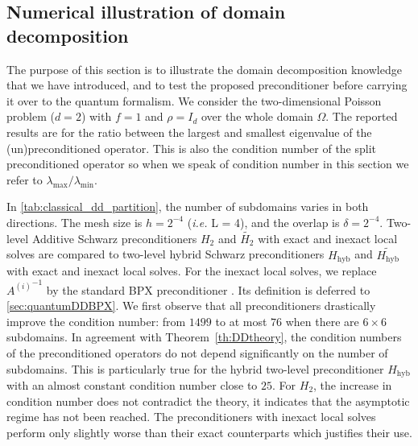 \documentclass[onefignum,onetabnum]{siamart251216}
\newcommand{\Hhyb}{H_{\text{hyb}}}
\newcommand{\Htwo}{H_2}
\newcommand{\Hhybap}{\widetilde{\Hhyb}}
\newcommand{\Htwoap}{\widetilde{\Htwo}}
\begin{document}
\subsection{Numerical illustration of domain decomposition}
The purpose of this section is to illustrate the domain decomposition knowledge that we have introduced, and to test the proposed preconditioner before carrying it over to the quantum formalism. We consider the two-dimensional Poisson problem ($d=2$) with $f=1$ and $\rho=I_d$ over the whole domain $\Omega$. The reported results are for the ratio between the largest and smallest eigenvalue of the (un)preconditioned operator. This is also the condition number of the split preconditioned operator so when we speak of condition number in this section we refer to ${\lambda_{\max}}/{\lambda_{\min}}$. 

In \cref{tab:classical_dd_partition}, the number of subdomains varies in both directions. The mesh size is $h=2^{-4}$ (\textit{i.e.} L = 4), and the overlap is $\delta = 2^{-4}$. Two-level Additive Schwarz preconditioners $\Htwo$ and $\Htwoap$ with exact and inexact local solves are compared to two-level hybrid Schwarz preconditioners $\Hhyb$ and $\Hhybap$  with exact and inexact local solves. For the inexact local solves, we replace ${A^{(i)}}^{-1}$ by the standard BPX preconditioner \cite{zbMATH04197323}. Its definition is deferred to \cref{sec:quantumDDBPX}. We first observe that all preconditioners drastically improve the condition number: from $1499$ to at most $76$ when there are $6 \times 6$ subdomains.  In agreement with Theorem~\ref{th:DDtheory}, the condition numbers of the preconditioned operators do not depend significantly on the number of subdomains. This is particularly true for the hybrid two-level preconditioner $\Hhyb$ with an almost constant condition number close to $25$. For $\Htwo$, the increase in condition number does not contradict the theory, it indicates that the asymptotic regime has not been reached. The preconditioners with inexact local solves perform only slightly worse than their exact counterparts which justifies their use. 
\end{document}
